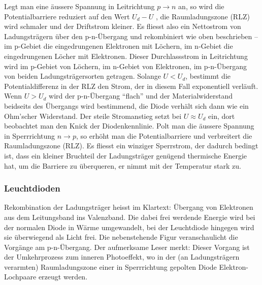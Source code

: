 Legt man eine  \"aussere  Spannung  in  Leitrichtung $p \to n$ an, so wird die
Potentialbarriere reduziert auf den Wert $U_d - U$ , die Raumladungszone (RLZ)
wird schmaler und der Driftstrom kleiner.  Es  fliesst also ein Nettostrom von
Ladungstr\"agern   \"uber   den  p-n-\"Ubergang  und  rekombiniert  wie   oben
beschrieben -- im p-Gebiet  die  eingedrungenen  Elektronen  mit L\"ochern, im
n-Gebiet die  eingedrungenen L\"ocher mit Elektronen. Dieser Durchlassstrom in
Leitrichtung wird im p-Gebiet von  L\"ochern,  im  n-Gebiet von Elektronen, im
p-n-\"Ubergang von beiden  Ladungstr\"agersorten  getragen. Solange $U < U_d$,
bestimmt  die  Potentialdifferenz  in  der RLZ den Strom, der in  diesem  Fall
exponentiell verl\"auft.  Wenn $U > U_d$ wird der p-n-\"Ubergang ``flach'' und
der  Materialwiderstand  beidseits des \"Ubergangs wird bestimmend, die  Diode
verh\"alt sich dann  wie  ein  Ohm'scher  Widerstand.  Der steile Stromanstieg
setzt  bei  $U  \approx  U_d$  ein,   dort   beobachtet   man  den  Knick  der
Diodenkennlinie. Polt man die  \"aussere  Spannung in Sperrrichtung $n \to p$,
so erh\"oht man  die  Potentialbarriere  und  verbreitert  die Raumladungszone
(RLZ). Es  fliesst  ein winziger Sperrstrom, der dadurch bedingt ist, dass ein
kleiner  Bruchteil  der Ladungstr\"ager gen\"ugend thermische Energie hat,  um
die  Barriere  zu  \"uberqueren,  er   nimmt  mit  der  Temperatur  stark  zu.


\subsubsection{Leuchtdioden}

Rekombination   der   Ladungstr\"ager  heisst  im  Klartext:  \"Ubergang   von
Elektronen  aus  dem  Leitungsband  ins  Valenzband.  Die  dabei frei werdende
Energie  wird  bei  der  normalen  Diode  in   W\"arme  umgewandelt,  bei  der
Leuchtdiode hingegen wird sie \"uberwiegend als Licht  frei. Die nebenstehende
Figur veranschaulicht  die Vorg\"ange am p-n-\"Ubergang. Der aufmerksame Leser
merkt: Dieser Vorgang ist der Umkehrprozess zum inneren Photoeffekt, wo in der
(an   Ladungstr\"agern  verarmten)  Raumladungszone  einer  in   Sperrrichtung
gepolten Diode Elektron-Lochpaare erzeugt werden.

